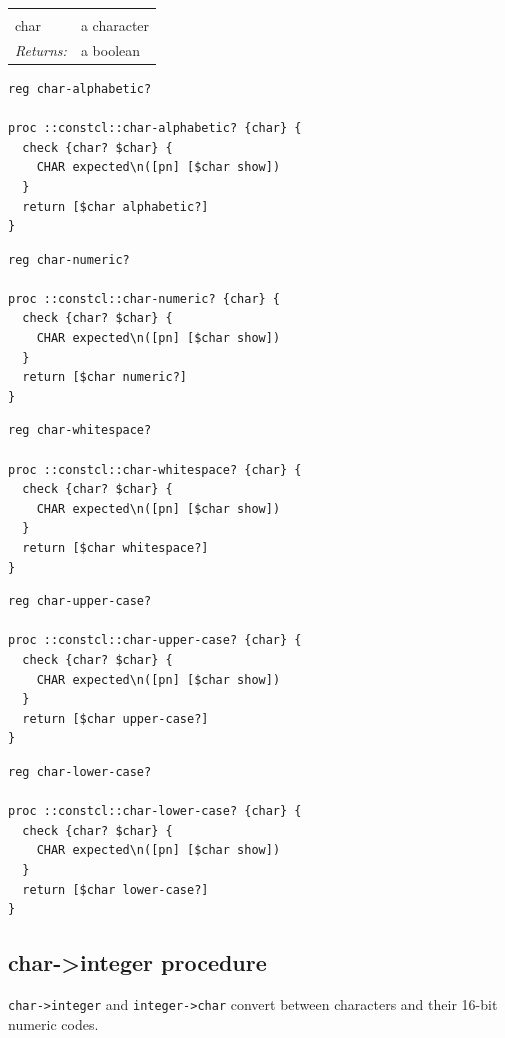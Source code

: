 \documentclass[twoside,9pt]{report}
\begin{document}
\noindent\begin{tabular}{ |p{1.5cm} p{8cm}| }
\hline
\rowcolor[HTML]{CCCCCC} \multicolumn{2}{|l|}{\bf char-upper-case?, char-lower-case? (public)} \\
char & a character \\
\textit{Returns:} & a boolean \\
\hline
\end{tabular}
\begin{lstlisting}
reg char-alphabetic?
 
proc ::constcl::char-alphabetic? {char} {
  check {char? $char} {
    CHAR expected\n([pn] [$char show])
  }
  return [$char alphabetic?]
}
\end{lstlisting}
\begin{lstlisting}
reg char-numeric?
 
proc ::constcl::char-numeric? {char} {
  check {char? $char} {
    CHAR expected\n([pn] [$char show])
  }
  return [$char numeric?]
}
\end{lstlisting}
\begin{lstlisting}
reg char-whitespace?
 
proc ::constcl::char-whitespace? {char} {
  check {char? $char} {
    CHAR expected\n([pn] [$char show])
  }
  return [$char whitespace?]
}
\end{lstlisting}
\begin{lstlisting}
reg char-upper-case?
 
proc ::constcl::char-upper-case? {char} {
  check {char? $char} {
    CHAR expected\n([pn] [$char show])
  }
  return [$char upper-case?]
}
\end{lstlisting}
\begin{lstlisting}
reg char-lower-case?
 
proc ::constcl::char-lower-case? {char} {
  check {char? $char} {
    CHAR expected\n([pn] [$char show])
  }
  return [$char lower-case?]
}
\end{lstlisting}
\subsection{char->integer procedure}
\label{char->integer-procedure}


\texttt{char->integer} and \texttt{integer->char} convert between characters and their 16-bit numeric codes.
\end{document}
